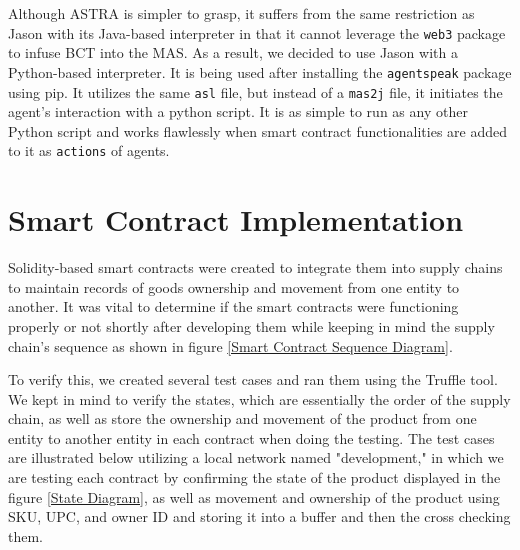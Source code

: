 \vspace{.5cm}

Although ASTRA is simpler to grasp, it suffers from the same restriction as Jason with its Java-based interpreter in that it cannot leverage the \texttt{web3} package to infuse \ac{BCT} into the \ac{MAS}. As a result, we decided to use Jason with a Python-based interpreter. It is being used after installing the \texttt{agentspeak} package using \ac{pip}. It utilizes the same \texttt{asl} file, but instead of a \texttt{mas2j} file, it initiates the agent's interaction with a python script. It is as simple to run as any other Python script and works flawlessly when smart contract functionalities are added to it as \texttt{actions} of agents.

\section{Smart Contract Implementation }

Solidity-based smart contracts were created to integrate them into supply chains to maintain records of goods ownership and movement from one entity to another. It was vital to determine if the smart contracts were functioning properly or not shortly after developing them while keeping in mind the supply chain's sequence as shown in figure \ref{Smart Contract Sequence Diagram}. 

\vspace{.5cm}

To verify this, we created several test cases and ran them using the Truffle tool. We kept in mind to verify the states, which are essentially the order of the supply chain, as well as store the ownership and movement of the product from one entity to another entity in each contract when doing the testing. The test cases are illustrated below utilizing a local network named "development," in which we are testing each contract by confirming the state of the product displayed in the figure \ref{State Diagram}, as well as movement and ownership of the product using \ac{SKU}, \ac{UPC}, and owner ID and storing it into a buffer and then the cross checking them.

\vspace{.5cm}


